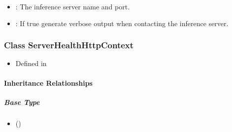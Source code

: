 \documentclass[letterpaper,10pt,english]{sphinxmanual}
\begin{document}
\begin{fulllineitems}
\begin{fulllineitems}
\begin{description}
\begin{itemize}
\item {} 
: The inference server name and port. 

\item {} 
: If true generate verbose output when contacting the inference server. 

\end{itemize}

\end{description}


\end{fulllineitems}


\end{fulllineitems}



\subsubsection{Class ServerHealthHttpContext}
\label{\detokenize{cpp_api/classnvidia_1_1inferenceserver_1_1client_1_1ServerHealthHttpContext:class-serverhealthhttpcontext}}\label{\detokenize{cpp_api/classnvidia_1_1inferenceserver_1_1client_1_1ServerHealthHttpContext:exhale-class-classnvidia-1-1inferenceserver-1-1client-1-1serverhealthhttpcontext}}\label{\detokenize{cpp_api/classnvidia_1_1inferenceserver_1_1client_1_1ServerHealthHttpContext::doc}}\begin{itemize}
\item {} 
Defined in {\hyperref[\detokenize{cpp_api/file_src_clients_c++_request.h:file-src-clients-c-request-h}]{}}

\end{itemize}


\paragraph{Inheritance Relationships}
\label{\detokenize{cpp_api/classnvidia_1_1inferenceserver_1_1client_1_1ServerHealthHttpContext:inheritance-relationships}}

\subparagraph{Base Type}
\label{\detokenize{cpp_api/classnvidia_1_1inferenceserver_1_1client_1_1ServerHealthHttpContext:base-type}}\begin{itemize}
\item {} 
 ({\hyperref[\detokenize{cpp_api/classnvidia_1_1inferenceserver_1_1client_1_1ServerHealthContext:exhale-class-classnvidia-1-1inferenceserver-1-1client-1-1serverhealthcontext}]{}})

\end{itemize}
\end{document}
